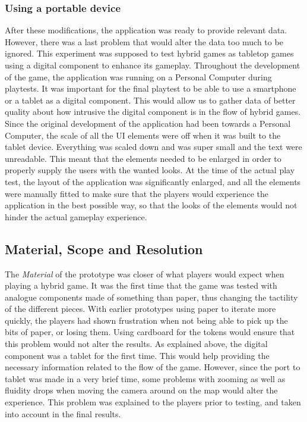\subsubsection{Using a portable device}
After these modifications, the application was ready to provide relevant data. However, there was a last problem that would alter the data too much to be ignored. This experiment was supposed to test hybrid games as tabletop games using a digital component to enhance its gameplay. Throughout the development of the game, the application was running on a Personal Computer during playtests. It was important for the final playtest to be able to use a smartphone or a tablet as a digital component. This would allow us to gather data of better quality about how intrusive the digital component is in the flow of hybrid games.  
Since the original development of the application had been towards a Personal Computer, the scale of all the UI elements were off when it was built to the tablet device. Everything was scaled down and was super small and the text were unreadable. This meant that the elements needed to be enlarged in order to properly supply the users with the wanted looks. At the time of the actual play test, the layout of the application was significantly enlarged, and all the elements were manually fitted to make sure that the players would experience the application in the best possible way, so that the looks of the elements would not hinder the actual gameplay experience.

\subsection{Material, Scope and Resolution}
The \textit{Material} of the prototype was closer of what players would expect when playing a hybrid game. It was the first time that the game was tested with analogue components made of something than paper, thus changing the tactility of the different pieces. With earlier prototypes using paper to iterate more quickly, the players had shown frustration when not being able to pick up the bits of paper, or losing them. Using cardboard for the tokens would ensure that this problem would not alter the results. As explained above, the digital component was a tablet for the first time. This would help providing the necessary information related to the flow of the game. However, since the port to tablet was made in a very brief time, some problems with zooming as well as fluidity drops when moving the camera around on the map would alter the experience. This problem was explained to the players prior to testing, and taken into account in the final results.

